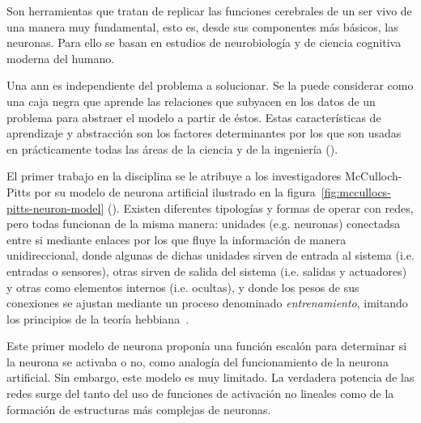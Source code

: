 Son herramientas que tratan de replicar las funciones cerebrales de un ser vivo de una manera muy fundamental, esto es, desde sus componentes más básicos, las neuronas. Para ello se basan en estudios de neurobiología y de ciencia cognitiva moderna del humano.

Una \gls{ann} es independiente del problema a solucionar. Se la puede considerar como una caja negra que aprende las relaciones que subyacen en los datos de un problema para abstraer el modelo a partir de éstos. Estas características de aprendizaje y abstracción son los factores determinantes por los que son usadas en prácticamente todas las áreas de la ciencia y de la ingeniería (\cite{Du2006}).

El primer trabajo en la disciplina se le atribuye a  los investigadores McCulloch-Pitts por su modelo de neurona artificial ilustrado en la figura~\ref{fig:mccullocs-pitts-neuron-model} (\cite{McCulloch1943}). Existen diferentes tipologías y formas de operar con redes, pero todas funcionan de la misma manera: unidades (e.g. neuronas) conectadsa entre si mediante enlaces por los que fluye la información de manera unidireccional, donde algunas de dichas unidades sirven de entrada al sistema (i.e. entradas o sensores), otras sirven de salida del sistema (i.e. salidas y actuadores) y otras como elementos internos (i.e. ocultas), y donde los pesos de sus conexiones se ajustan mediante un proceso denominado \textit{entrenamiento}, imitando los principios de la teoría hebbiana~\cite{hebb19680}.

Este primer modelo de neurona proponía una función escalón para determinar si la neurona se activaba o no, como analogía del funcionamiento de la neurona artificial. Sin embargo, este modelo es muy limitado. La verdadera potencia de las redes surge del tanto del uso de funciones de activación no lineales como de la formación de estructuras más complejas de neuronas.

